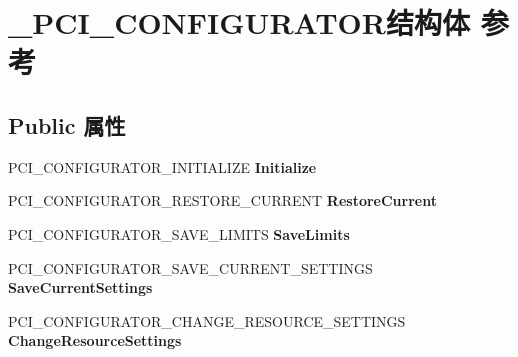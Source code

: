 \hypertarget{struct___p_c_i___c_o_n_f_i_g_u_r_a_t_o_r}{}\section{\+\_\+\+P\+C\+I\+\_\+\+C\+O\+N\+F\+I\+G\+U\+R\+A\+T\+O\+R结构体 参考}
\label{struct___p_c_i___c_o_n_f_i_g_u_r_a_t_o_r}
\subsection*{Public 属性}
\begin{DoxyCompactItemize}
\item 
\mbox{\label{struct___p_c_i___c_o_n_f_i_g_u_r_a_t_o_r_ac99dbc3bf116e5e86d9b268f5ea1f097}} 
P\+C\+I\+\_\+\+C\+O\+N\+F\+I\+G\+U\+R\+A\+T\+O\+R\+\_\+\+I\+N\+I\+T\+I\+A\+L\+I\+ZE {\bfseries Initialize}
\item 
\mbox{\label{struct___p_c_i___c_o_n_f_i_g_u_r_a_t_o_r_a210ea8511e37444e663a48691ed01f5b}} 
P\+C\+I\+\_\+\+C\+O\+N\+F\+I\+G\+U\+R\+A\+T\+O\+R\+\_\+\+R\+E\+S\+T\+O\+R\+E\+\_\+\+C\+U\+R\+R\+E\+NT {\bfseries Restore\+Current}
\item 
\mbox{\label{struct___p_c_i___c_o_n_f_i_g_u_r_a_t_o_r_a62836ed383a4ee567462a7151599a22a}} 
P\+C\+I\+\_\+\+C\+O\+N\+F\+I\+G\+U\+R\+A\+T\+O\+R\+\_\+\+S\+A\+V\+E\+\_\+\+L\+I\+M\+I\+TS {\bfseries Save\+Limits}
\item 
\mbox{\label{struct___p_c_i___c_o_n_f_i_g_u_r_a_t_o_r_ad1afcf76372183ae2901e87186430c21}} 
P\+C\+I\+\_\+\+C\+O\+N\+F\+I\+G\+U\+R\+A\+T\+O\+R\+\_\+\+S\+A\+V\+E\+\_\+\+C\+U\+R\+R\+E\+N\+T\+\_\+\+S\+E\+T\+T\+I\+N\+GS {\bfseries Save\+Current\+Settings}
\item 
\mbox{\label{struct___p_c_i___c_o_n_f_i_g_u_r_a_t_o_r_a0a3e915ae11475be1c1cde73f7bfb3ca}} 
P\+C\+I\+\_\+\+C\+O\+N\+F\+I\+G\+U\+R\+A\+T\+O\+R\+\_\+\+C\+H\+A\+N\+G\+E\+\_\+\+R\+E\+S\+O\+U\+R\+C\+E\+\_\+\+S\+E\+T\+T\+I\+N\+GS {\bfseries Change\+Resource\+Settings}
\item 
\mbox{\label{struct___p_c_i___c_o_n_f_i_g_u_r_a_t_o_r_ac91e385ad84cd44072ff822d0db5da75}} 

\end{DoxyCompactItemize}
